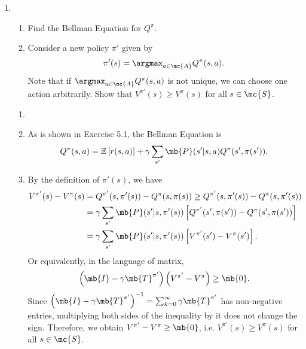 \begin{exercise}
\begin{enumerate}
        \item
            \begin{enumerate}
                \item Find the Bellman Equation for $Q^\pi$.
                \item   Consider a new policy $\pi'$ given by
                    \begin{align*}
                        \pi'(s)=\argmax_{a\in\mc{A}} Q^\pi(s,a).
                    \end{align*}
                    Note that if $\argmax_{a\in\mc{A}} Q^\pi(s,a)$ is not unique, we can choose one action arbitrarily. Show that  $V^{\pi'}(s) \geq V^\pi(s)$ for all $s\in \mc{S}$.
            \end{enumerate}
            \begin{solution}
                \begin{enumerate}
                    \item []
                    \item As is shown in Exercise 5.1, the Bellman Equation is
                        \begin{align*}
                            Q^\pi(s,a) = \mathbb{E}\left[r(s,a) \right] + \gamma \sum_{s'}\mb{P}(s'|s,a) Q^\pi(s',\pi(s')).
                        \end{align*}
                    \item By the definition of $\pi'(s)$, we have
                        \begin{align*}
                            V^{\pi'}(s) - V^\pi(s)
                             & = Q^{\pi'} (s,\pi'(s)) - Q^\pi (s,\pi(s)) \ge Q^{\pi'} (s,\pi'(s)) - Q^\pi (s,\pi'(s))       \\
                             & = \gamma \sum_{s'}\mb{P}(s'|s,\pi'(s)) \left[Q^{\pi'}(s',\pi(s')) - Q^\pi(s',\pi(s'))\right] \\
                             & = \gamma \sum_{s'}\mb{P}(s'|s,\pi'(s)) \left[V^{\pi'}(s') - V^\pi(s')\right].
                        \end{align*}
                        Or equivalently, in the language of matrix,
                        \begin{align*}
                            \left(\mb{I} - \gamma \mb{T}^{\pi'}\right) \left(V^{\pi'} - V^\pi\right) \ge \mb{0}.
                        \end{align*}
                        Since $\left(\mb{I} - \gamma \mb{T}^{\pi'}\right)^{-1} = \sum_{k=0}^\infty \gamma \mb{T}^{\pi'}$ has non-negative entries, multiplying both sides of the inequality by it does not change the sign. Therefore, we obtain $V^{\pi'} - V^\pi \geq \mb{0}$, i.e. $V^{\pi'}(s) \geq V^\pi(s)$ for all $s\in \mc{S}$.
                        \qedhere
                \end{enumerate}
            \end{solution}
    \end{enumerate}

\end{exercise}
\clearpage




